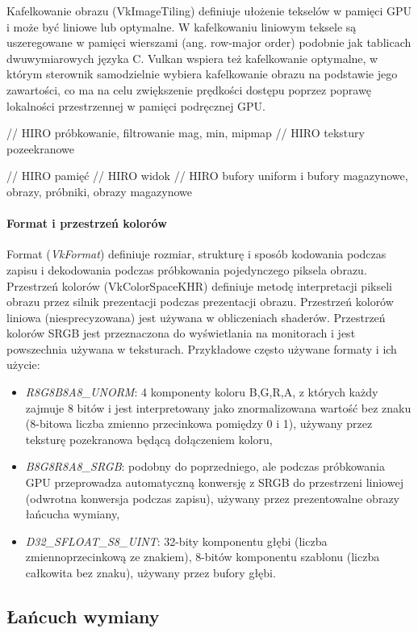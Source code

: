 Kafelkowanie obrazu (VkImageTiling) definiuje ułożenie tekselów w pamięci GPU i może być liniowe lub optymalne.
W kafelkowaniu liniowym teksele są uszeregowane w pamięci wierszami (ang. row-major order) podobnie jak tablicach dwuwymiarowych języka C.
Vulkan wspiera też kafelkowanie optymalne, w którym sterownik samodzielnie wybiera kafelkowanie obrazu na podstawie jego zawartości, co ma na celu zwiększenie prędkości dostępu poprzez poprawę lokalności przestrzennej w pamięci podręcznej GPU.

// HIRO próbkowanie, filtrowanie mag, min, mipmap
// HIRO tekstury pozeekranowe

// HIRO pamięć
// HIRO widok
// HIRO bufory uniform i bufory magazynowe, obrazy, próbniki, obrazy magazynowe

\paragraph{Format i przestrzeń kolorów}
Format (\textit{VkFormat}) definiuje rozmiar, strukturę i sposób kodowania podczas zapisu i dekodowania podczas próbkowania pojedynczego piksela obrazu.
Przestrzeń kolorów (VkColorSpaceKHR) definiuje metodę interpretacji pikseli obrazu przez silnik prezentacji podczas prezentacji obrazu.
Przestrzeń kolorów liniowa (niesprecyzowana) jest używana w obliczeniach shaderów.
Przestrzeń kolorów SRGB jest przeznaczona do wyświetlania na monitorach i jest powszechnia używana w teksturach.
Przykładowe często używane formaty i ich użycie:
\begin{itemize}
	\item \textit{R8G8B8A8\_UNORM}: 4 komponenty koloru B,G,R,A, z których każdy zajmuje 8 bitów i jest interpretowany jako znormalizowana wartość bez znaku (8-bitowa liczba zmienno przecinkowa pomiędzy 0 i 1), używany przez teksturę pozekranowa będącą dołączeniem koloru,
	\item \textit{B8G8R8A8\_SRGB}: podobny do poprzedniego, ale podczas próbkowania GPU przeprowadza automatyczną konwersję z SRGB do przestrzeni liniowej (odwrotna konwersja podczas zapisu), używany przez prezentowalne obrazy łańcucha wymiany,
	\item \textit{D32\_SFLOAT\_S8\_UINT}: 32-bity komponentu głębi (liczba zmiennoprzecinkową ze znakiem), 8-bitów komponentu szablonu (liczba całkowita bez znaku), używany przez bufory głębi.
\end{itemize}


\subsection{Łańcuch wymiany}

